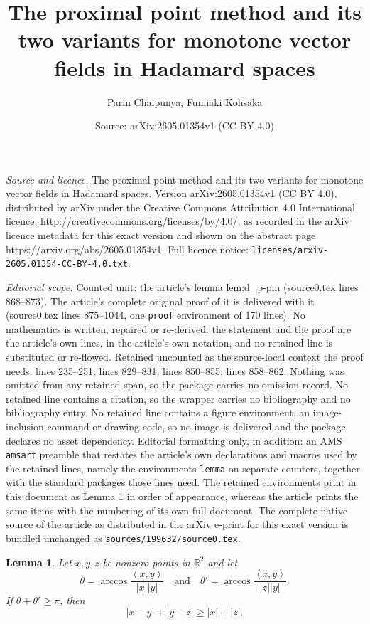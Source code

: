 \documentclass[10pt,a4paper]{amsart}
\title{The proximal point method and its two variants for monotone vector fields in Hadamard spaces}
\author{Parin Chaipunya, Fumiaki Kohsaka}
\date{Source: arXiv:2605.01354v1 (CC BY 4.0)}
\newtheorem{lemma}{Lemma}
\def\R{\mathbb R}
\providecommand{\abs}[1]{\left\lvert#1\right\rvert}
\newcommand{\ip}[2]{\left\langle #1, #2 \right\rangle}
\begin{document}
\maketitle

\noindent\emph{Source and licence.} The proximal point method and its two variants for monotone vector fields in Hadamard spaces. Version arXiv:2605.01354v1 (CC BY 4.0), distributed by arXiv under the Creative Commons Attribution 4.0 International licence, http://creativecommons.org/licenses/by/4.0/, as recorded in the arXiv licence metadata for this exact version and shown on the abstract page https://arxiv.org/abs/2605.01354v1. Full licence notice: \texttt{licenses/arxiv-2605.01354-CC-BY-4.0.txt}.\par\smallskip

\noindent\textit{Editorial scope.} Counted unit: the article's lemma lem:d\_p-pm (source0.tex lines 868--873). The article's complete original proof of it is delivered with it (source0.tex lines 875--1044, one \texttt{proof} environment of 170 lines). No mathematics is written, repaired or re-derived: the statement and the proof are the article's own lines, in the article's own notation, and no retained line is substituted or re-flowed.  Retained uncounted as the source-local context the proof needs: lines 235--251; lines 829--831; lines 850--855; lines 858--862.  Nothing was omitted from any retained span, so the package carries no omission record.  No retained line contains a citation, so the wrapper carries no bibliography and no bibliography entry.  No retained line contains a figure environment, an image-inclusion command or drawing code, so no image is delivered and the package declares no asset dependency.  Editorial formatting only, in addition: an AMS \texttt{amsart} preamble that restates the article's own declarations and macros used by the retained lines, namely the environments \texttt{lemma} on separate counters, together with the standard packages those lines need.  The retained environments print in this document as Lemma 1 in order of appearance, whereas the article prints the same items with the numbering of its own full document.  The complete native source of the article as distributed in the arXiv e-print for this exact version is bundled unchanged as \texttt{sources/199632/source0.tex}.
\begin{lemma}\label{lem:Alex}
 Let $x,y,z$ be nonzero points in $\R^2$ 
 and let 
 \[
  \theta = \arccos \frac{\ip{x}{y}}{\abs{x}\abs{y}} 
 \quad \textrm{and} \quad 
  \theta' = \arccos \frac{\ip{z}{y}}{\abs{z}\abs{y}}. 
 \]
 If $\theta+\theta' \geq \pi$, 
 then 
 \[
  \abs{x-y} + \abs{y-z} \geq \abs{x} + \abs{z}. 
 \]
\end{lemma}
\end{document}
